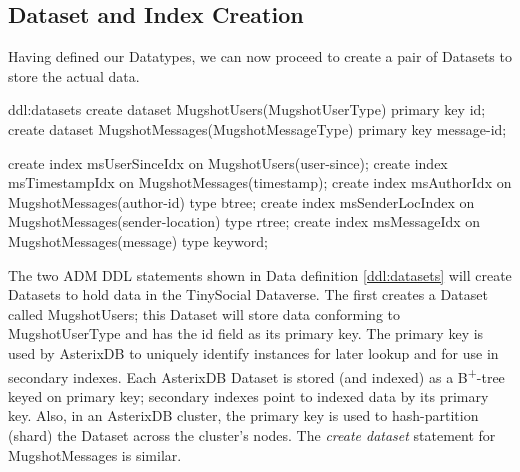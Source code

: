 
\pagebreak
\subsection{Dataset and Index Creation}\label{ss:dataset}

Having defined our Datatypes, we can now proceed to create a pair of Datasets to store the actual data. 

\begin{ddl}{ddl:datasets}
create dataset MugshotUsers(MugshotUserType)
    primary key id;
create dataset MugshotMessages(MugshotMessageType)
    primary key message-id;

create index msUserSinceIdx 
    on MugshotUsers(user-since);
create index msTimestampIdx
    on MugshotMessages(timestamp);
create index msAuthorIdx
    on MugshotMessages(author-id) type btree;
create index msSenderLocIndex
    on MugshotMessages(sender-location) type rtree;
create index msMessageIdx
    on MugshotMessages(message) type keyword;
\end{ddl}


The two ADM DDL statements shown in Data definition \ref{ddl:datasets} will create Datasets to hold data in the TinySocial Dataverse.
The first creates a Dataset called MugshotUsers; 
this Dataset will store data conforming to MugshotUserType and has the id field as its primary key. 
The primary key is used by AsterixDB to uniquely identify instances for later lookup and for use in secondary indexes.
Each AsterixDB Dataset is stored (and indexed) as a B\textsuperscript{+}-tree keyed on primary key; secondary indexes point to indexed data by its primary key. 
Also, in an AsterixDB cluster, the primary key is used to hash-partition (shard) the Dataset across the cluster's nodes. 
The \emph{create dataset} statement for MugshotMessages is similar. 

